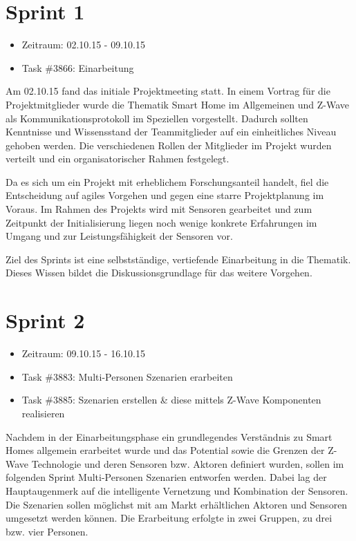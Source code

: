 \documentclass[12pt, oneside, smallheadings]{scrbook}
\begin{document}
\section{Sprint 1}
\begin{itemize}
	\item Zeitraum: 02.10.15 - 09.10.15 \newline
	\item Task \#3866: Einarbeitung\\
\end{itemize}
\noindent
Am 02.10.15 fand das initiale Projektmeeting statt. In einem Vortrag für die Projektmitglieder wurde die Thematik Smart Home im Allgemeinen und Z-Wave als Kommunikationsprotokoll im Speziellen vorgestellt. Dadurch sollten Kenntnisse und Wissensstand der Teammitglieder auf ein einheitliches Niveau gehoben werden. Die verschiedenen Rollen der Mitglieder im Projekt wurden verteilt und ein organisatorischer Rahmen festgelegt.

Da es sich um ein Projekt mit erheblichem Forschungsanteil handelt, fiel die Entscheidung auf agiles Vorgehen und gegen eine starre Projektplanung im Voraus. Im Rahmen des Projekts wird mit Sensoren gearbeitet und zum Zeitpunkt der Initialisierung liegen noch wenige konkrete Erfahrungen im Umgang und zur Leistungsfähigkeit der Sensoren vor.

Ziel des Sprints ist eine selbstständige, vertiefende Einarbeitung in die Thematik. Dieses Wissen bildet die Diskussionsgrundlage für das weitere Vorgehen.

\section{Sprint 2}
\begin{itemize}
	\item Zeitraum: 09.10.15 - 16.10.15 \newline
	\item Task \#3883: Multi-Personen Szenarien erarbeiten
	\item Task \#3885: Szenarien erstellen \& diese mittels Z-Wave Komponenten realisieren\\
\end{itemize}
\noindent
Nachdem in der Einarbeitungsphase ein grundlegendes Verständnis zu Smart Homes allgemein erarbeitet wurde und das Potential sowie die Grenzen der Z-Wave Technologie und deren Sensoren bzw. Aktoren definiert wurden, sollen im folgenden Sprint Multi-Personen Szenarien entworfen werden. Dabei lag der Hauptaugenmerk auf die intelligente Vernetzung und Kombination der Sensoren. Die Szenarien sollen möglichst mit am Markt erhältlichen Aktoren und Sensoren umgesetzt werden können. Die Erarbeitung erfolgte in zwei Gruppen, zu drei bzw. vier Personen.
\end{document}
